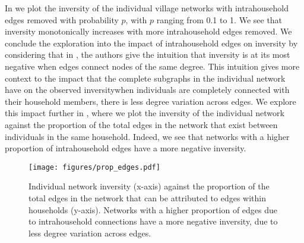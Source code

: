 In  we plot the inversity of the individual village networks with intrahousehold edges removed with probability $p$, with $p$ ranging from 0.1 to 1. We see that inversity monotonically increases with more intrahousehold edges removed. We conclude the exploration into the impact of intrahousehold edges on inversity by considering that in \cite{kumar2024friendship}, the authors give the intuition that inversity is at its most negative when edges connect nodes of the same degree. This intuition gives more context to the impact that the complete subgraphs in the individual network have on the observed inversity\textemdash when individuals are completely connected with their household members, there is less degree variation across edges. We explore this impact further in , where we plot the inversity of the individual network against the proportion of the total edges in the network that exist between individuals in the same household. Indeed, we see that networks with a higher proportion of intrahousehold edges have a more negative inversity.

\begin{figure}
    \centering
    \texttt{[image: figures/prop\_edges.pdf]}
    \caption{Individual network inversity (x-axis) against the proportion of the total edges in the network that can be attributed to edges within households (y-axis). Networks with a higher proportion of edges due to intrahousehold connections have a more negative inversity, due to less degree variation across edges.}
    \label{fig:prop_edges}
\end{figure}